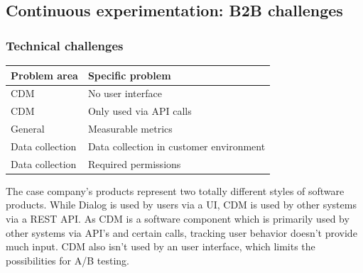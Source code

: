 \documentclass[english]{tktltiki2}
\theoremstyle{definition}
\theoremstyle{remark}
\begin{document}





\subsection{Continuous experimentation: B2B challenges}

\subsubsection{Technical challenges}

\begin{center}
    \begin{tabular}{ | l | p{5cm} |}
    \hline
    Problem area & Specific problem \\ \hline
    CDM & No user interface \\ \hline
	CDM & Only used via API calls \\ \hline
	General & Measurable metrics \\ \hline
	Data collection & Data collection in customer environment \\ \hline
	Data collection & Required permissions \\
    \hline
    \end{tabular}
\end{center}

The case company's products represent two totally different styles of software products. While Dialog is used by users via a UI, CDM is used by other systems via a REST API. As CDM is a software component which is primarily used by other systems via API's and certain calls, tracking user behavior doesn't provide much input. CDM also isn't used by an user interface, which limits the possibilities for A/B testing. 
\end{document}
